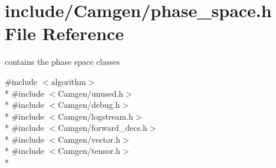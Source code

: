 \hypertarget{a00718}{}\section{include/\+Camgen/phase\+\_\+space.h File Reference}
\label{a00718}


contains the phase space classes  


{\ttfamily \#include $<$algorithm$>$}\\*
{\ttfamily \#include $<$Camgen/unused.\+h$>$}\\*
{\ttfamily \#include $<$Camgen/debug.\+h$>$}\\*
{\ttfamily \#include $<$Camgen/logstream.\+h$>$}\\*
{\ttfamily \#include $<$Camgen/forward\+\_\+decs.\+h$>$}\\*
{\ttfamily \#include $<$Camgen/vector.\+h$>$}\\*
{\ttfamily \#include $<$Camgen/tensor.\+h$>$}\\*
